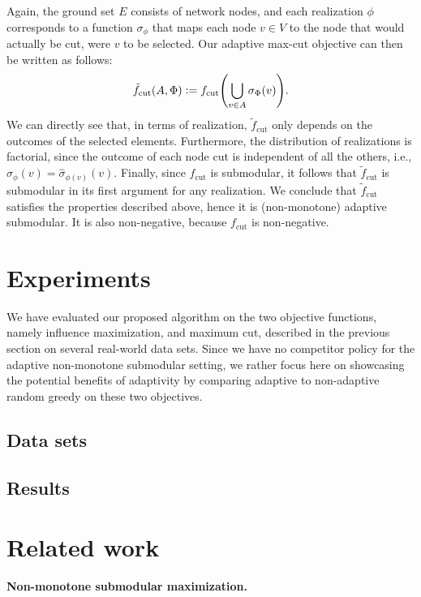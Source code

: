 \documentclass{article}
\newcommand{\defeq}{\vcentcolon=}
\let\originalleft\left
\let\originalright\right
\renewcommand{\left}{\mathopen{}\mathclose\bgroup\originalleft}
\renewcommand{\right}{\aftergroup\egroup\originalright}
\renewcommand{\paragraph}[1]{\vspace{0.3em}\noindent\textbf{#1.}\makebox[0.5em]{}}
\begin{document}
Again, the ground set $E$ consists of network nodes, and each realization $\phi$ corresponds to a function $\sigma_{\phi}$ that maps each node $v \in V$ to the node that would actually be cut, were $v$ to be selected.
Our adaptive max-cut objective can then be written as follows:
\begin{align*}
  \tilde{f}_{\textrm{cut}}(A, \Phi) \defeq f_{\textrm{cut}}\left(\bigcup_{v \in A}\sigma_{\Phi}(v)\right).
\end{align*}
We can directly see that, in terms of realization, $\tilde{f}_{\textrm{cut}}$ only depends on the outcomes of the selected elements.
Furthermore, the distribution of realizations is factorial, since the outcome of each node cut is independent of all the others, i.e., $\sigma_{\phi}(v) = \hat{\sigma}_{\phi(v)}(v)$.
Finally, since $f_{\textrm{cut}}$ is submodular, it follows that $\tilde{f}_{\textrm{cut}}$ is submodular in its first argument for any realization.
We conclude that $\tilde{f}_{\textrm{cut}}$ satisfies the properties described above, hence it is (non-monotone) adaptive submodular.
It is also non-negative, because $f_{\textrm{cut}}$ is non-negative.

\section{Experiments}
We have evaluated our proposed algorithm on the two objective functions, namely influence maximization, and maximum cut, described in the previous section on several real-world data sets.
Since we have no competitor policy for the adaptive non-monotone submodular setting, we rather focus here on showcasing the potential benefits of adaptivity by comparing adaptive to non-adaptive random greedy on these two objectives.

\subsection{Data sets}

\subsection{Results}

\section{Related work}
\paragraph{Non-monotone submodular maximization}\\
\end{document}

